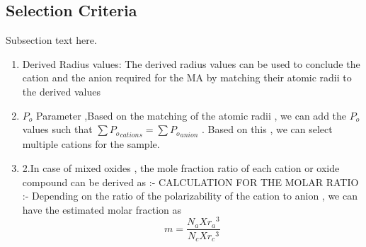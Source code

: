 \documentclass[journal]{IEEEtran}
\begin{document}
\begin{multicols}{2}
{}









\subsection{Selection Criteria}
Subsection text here.
\begin{enumerate}
	\item{Derived Radius values: The derived radius values can be used to conclude the cation and the anion required for the MA by matching their atomic radii to the derived values}
	\item {$P_o $ Parameter ,Based on the matching of the atomic radii , we can add the $P_o$ values such that $\sum {P_o}_{cations} = \sum {P_o}_{anion}$ }. Based on this , we can select multiple cations for the sample.
	\item{2.In case of mixed oxides , the mole fraction ratio of each cation or oxide compound can be derived as :-
		CALCULATION FOR THE MOLAR RATIO :-
		Depending on the ratio of the polarizability of the cation to anion , we can have the estimated molar fraction as
		\begin{equation}
		m = \frac{N_a X {r_a}^3}{N_c X {r_c}^3}
		\end{equation}
		
}
\end{enumerate}
\end{multicols}
\end{document}
